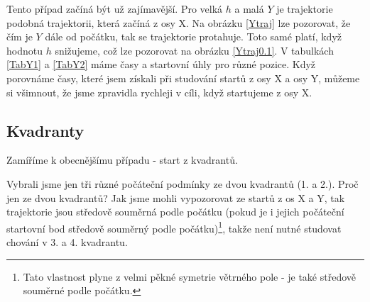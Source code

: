 \documentclass[reqno, a4paper]{amsart}
\numberwithin{equation}{section}
\begin{document}
Tento případ začíná být už zajímavější. Pro velká $h$ a malá $Y$ je trajektorie podobná trajektorii, která začíná z osy X. Na obrázku \eqref{Ytraj} lze pozorovat, že čím je $Y$ dále od počátku, tak se trajektorie protahuje. Toto samé platí, když hodnotu $h$ snižujeme, což lze pozorovat na obrázku \eqref{Ytraj0.1}. V tabulkách \eqref{TabY1} a \eqref{TabY2} máme časy a startovní úhly pro různé pozice. Když porovnáme časy, které jsem získali při studování startů z osy X a osy Y, můžeme si všimnout, že jsme zpravidla rychleji v cíli, když startujeme z osy X. 
\subsection{Kvadranty}
\label{sec: Kvad}
Zamíříme k obecnějšímu případu - start z kvadrantů.

Vybrali jsme jen tři různé počáteční podmínky ze dvou kvadrantů (1. a 2.). Proč jen ze dvou kvadrantů? Jak jsme mohli vypozorovat ze startů z os X a Y, tak trajektorie jsou středově souměrná podle počátku (pokud je i jejich počáteční startovní bod středově souměrný podle počátku)\footnote{Tato vlastnost plyne z velmi pěkné symetrie větrného pole - je také středově souměrné podle počátku.}, takže není nutné studovat chování v 3. a 4. kvadrantu.
\end{document}
